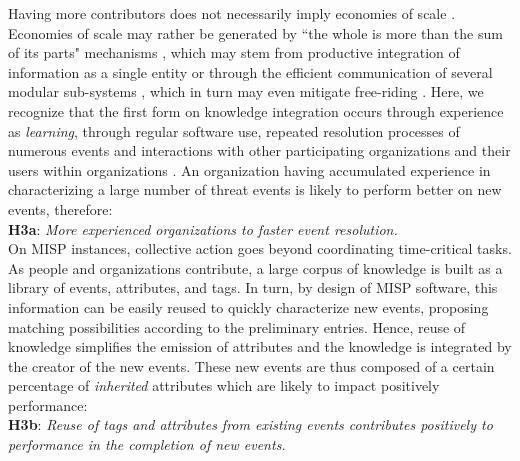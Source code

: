 \documentclass[unnumsec,webpdf,contemporary,large]{oup-authoring-template}%
\theoremstyle{thmstyleone}%
\theoremstyle{thmstyletwo}%
\theoremstyle{thmstylethree}%
\begin{document}
Having more contributors does not necessarily imply economies of scale \cite{scholtes_aristotle_2016}. Economies of scale may rather be generated by ``the whole is more than the sum of its parts" mechanisms \cite{sornette2014much}, which may stem from productive integration of information  \cite{oizumi_phenomenology_2014, malone_superminds_2018,engel_integrated_2018} as a single entity \cite{sornette2014much} or through the efficient communication of several modular sub-systems \cite{barrett_practical_2011,baldwin_design_2000}, which in turn may even mitigate free-riding \cite{baldwin_architecture_2006}. Here, we recognize that the first form on knowledge integration occurs through experience as {\it learning}, through regular software use, repeated resolution processes of numerous events and interactions with other participating organizations and their users within organizations \cite{argote_organizational_2011}. An organization having accumulated experience in characterizing a large number of threat events is likely to perform better on new events, therefore:\\

\textbf{H3a}: \textit{More experienced organizations to faster event resolution.}\\

On MISP instances, collective action goes beyond coordinating time-critical tasks. As people and organizations contribute, a large corpus of knowledge is built as a library of events, attributes, and tags. In turn, by design of MISP software, this information can be easily reused to quickly characterize new events, proposing matching possibilities according to the preliminary entries. Hence,  reuse of knowledge simplifies the emission of attributes and the knowledge is integrated by the creator of the new events. These new events are thus composed of a certain percentage of {\it inherited} attributes which are likely to impact positively performance:\\ 

\textbf{H3b}: \textit{Reuse of tags and attributes from existing events contributes positively to performance in the completion of new events.}\\
\end{document}

